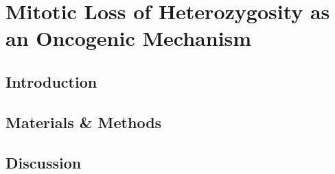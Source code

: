 \chapter{Mitotic Loss of Heterozygosity as an Oncogenic Mechanism}

\ifpdf
    \graphicspath{{Chapter5/Figs/Raster/}{Chapter5/Figs/PDF/}{Chapter5/Figs/}}
\else
    \graphicspath{{Chapter5/Figs/Vector/}{Chapter5/Figs/}}
\fi

\section{Introduction}
\section{Materials \& Methods}
\section{Discussion}

